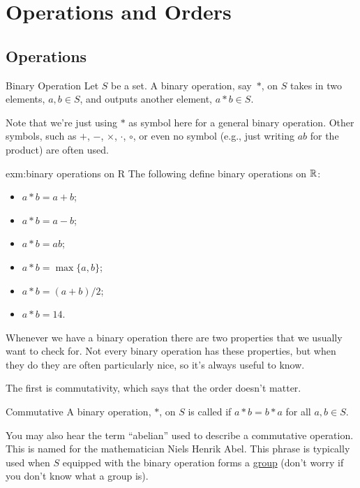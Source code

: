 \documentclass[fleqn]{LectureClass/LectureClass}
\begin{document}
    
    
    \section{Operations and Orders}
    \subsection{Operations}
    \begin{dfn}{Binary Operation}{}
        Let \(S\) be a set.
        A binary operation, say~\(*\), on \(S\) takes in two elements, \(a, b \in S\), and outputs another element, \(a * b \in S\).
    \end{dfn}
    
    Note that we're just using \(*\) as symbol here for a general binary operation.
    Other symbols, such as \(+\), \(-\), \(\times\), \(\cdot\), \(\circ\), or even no symbol (e.g., just writing \(ab\) for the product) are often used.
    
    \begin{exm}{}{exm:binary operations on R}
        The following define binary operations on \(\mathbb{R}\):
        \begin{itemize}
            \item \(a * b = a + b\);
            \item \(a * b = a - b\);
            \item \(a * b = ab\);
            \item \(a * b = \max\{a, b\}\);
            \item \(a * b = (a + b) / 2\);
            \item \(a * b = 14\).
        \end{itemize}
    \end{exm}
    
    Whenever we have a binary operation there are two properties that we usually want to check for.
    Not every binary operation has these properties, but when they do they are often particularly nice, so it's always useful to know.
    
    The first is commutativity, which says that the order doesn't matter.
    
    \begin{dfn}{Commutative}{}
        A binary operation, \(*\), on \(S\) is called  if \(a * b = b * a\) for all \(a, b \in S\).
    \end{dfn}
    
    \begin{remark}{}{}
        You may also hear the term \enquote{abelian} used to describe a commutative operation.
        This is named for the mathematician Niels Henrik Abel.
        This phrase is typically used when \(S\) equipped with the binary operation forms a \href{https://en.wikipedia.org/wiki/Group_(mathematics)}{group} (don't worry if you don't know what a group is).
    \end{remark}
    
\end{document}

